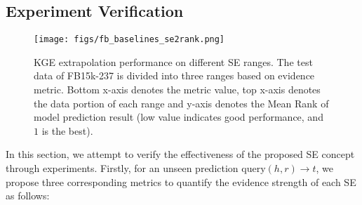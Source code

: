 \documentclass[letterpaper]{article} \usepackage{aaai22}  \usepackage{times}  \usepackage{helvet}  \usepackage{courier}  \usepackage[hyphens]{url}  \usepackage{graphicx} \urlstyle{rm} \def\UrlFont{\rm}  \usepackage{natbib}  \usepackage{caption} \DeclareCaptionStyle{ruled}{labelfont=normalfont,labelsep=colon,strut=off} \frenchspacing  \setlength{\pdfpagewidth}{8.5in}  \setlength{\pdfpageheight}{11in}  \usepackage{algorithm}
\begin{document}
\subsection{Experiment Verification}
\begin{figure*}[t]
    \centering
    \texttt{[image: figs/fb\_baselines\_se2rank.png]}
    \caption{
        KGE extrapolation performance on different SE ranges. The test data of FB15k-237 is divided into three ranges based on evidence metric. Bottom x-axis denotes the metric value, top x-axis denotes the data portion of each range and y-axis denotes the Mean Rank of model prediction result 
        (low value indicates good performance, and $1$ is the best).
    } 
    \label{fig: fb_baselines_se2rank} 
\end{figure*}

\label{sec: SE Verification}
In this section, we attempt to verify the effectiveness of the proposed SE concept through experiments. Firstly, for an unseen prediction $\mathrm{query}(h, r) \rightarrow t$, we propose three corresponding metrics to quantify the evidence strength of each SE as follows: 
\end{document}
